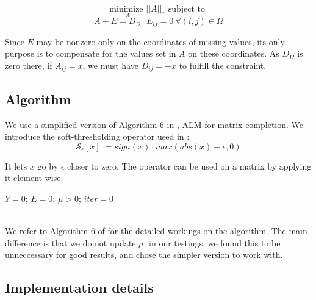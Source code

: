 \documentclass[10pt,conference,compsocconf]{IEEEtran}
\begin{document}
$$ \underset{A}{\text{minimize }} ||A||_* \text{ subject to  }$$ 
$$A + E = D_{\Omega} \ \ \ E_{ij} = 0 \ \forall(i, j) \in \Omega$$

Since $E$ may be nonzero only on the coordinates of missing values, its only purpose is to compensate for the values set in $A$ on these coordinates. As $D_{\Omega}$ is zero there, if $A_{ij} = x$, we must have $D_{ij} = -x$ to fulfill the constraint. \\

\subsection{Algorithm}

We use a simplified version of Algorithm 6 in \cite{almpaper}, ALM for matrix completion. We introduce the soft-thresholding operator used in \cite{almpaper}: \\

$$\mathcal{S}_{\epsilon}[x] := sign(x) \cdot max(abs(x) - \epsilon, 0)$$

It lets $x$ go by $\epsilon$ closer to zero. The operator can be used on a matrix by applying it element-wise.


\begin{algorithm}
$Y = 0$; $E = 0$; $\mu > 0$; $iter = 0$ \\
\ \\

\end{algorithm}

We refer to Algorithm 6 of \cite{almpaper} for the detailed workings on the algorithm. The main difference is
that we do not update $\mu$; in our testings, we found this to be unneccessary for good results, and chose
the simpler version to work with.

\subsection{Implementation details}
\end{document}
